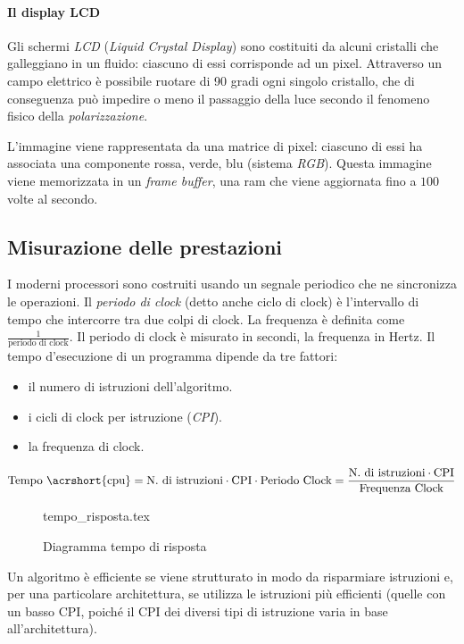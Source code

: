 \documentclass[class=book, crop=false, oneside]{standalone}
\begin{document}
\paragraph{Il display LCD}
Gli schermi \emph{LCD} (\emph{Liquid Crystal Display}) sono costituiti da alcuni cristalli che galleggiano in un fluido: ciascuno di essi corrisponde ad un pixel.
Attraverso un campo elettrico è possibile ruotare di 90 gradi ogni singolo cristallo, che di conseguenza può impedire o meno il passaggio della luce secondo il fenomeno fisico della \emph{polarizzazione}.

L'immagine viene rappresentata da una matrice di pixel: ciascuno di essi ha associata una componente rossa, verde, blu (sistema \emph{RGB}).
Questa immagine viene memorizzata in un \emph{frame buffer}, una \acrshort{ram} che viene aggiornata fino a \(100\) volte al secondo.

\subsection{Misurazione delle prestazioni}
I moderni processori sono costruiti usando un segnale periodico che ne sincronizza le operazioni. Il \emph{periodo di clock} (detto anche ciclo di clock) è l'intervallo di tempo che intercorre tra due colpi di clock. La frequenza è definita come \(\frac{1}{\text{periodo di clock}}\). Il periodo di clock è misurato in secondi, la frequenza in Hertz. Il tempo d'esecuzione di un programma dipende da tre fattori:
\begin{itemize}[nolistsep]
	\item il numero di istruzioni dell'algoritmo.
	\item i cicli di clock per istruzione (\emph{CPI}).
	\item la frequenza di clock.
\end{itemize}

\begin{equation*}
\text{Tempo \acrshort{cpu}} = \text{N. di istruzioni} \cdot \text{CPI} \cdot \text{Periodo Clock} = \frac{\text{N. di istruzioni} \cdot \text{CPI}}{\text{Frequenza Clock}}
\end{equation*}

\begin{figure}[H]
	\centering
	{tempo_risposta.tex}
	\caption{Diagramma tempo di risposta}
\end{figure}

Un algoritmo è efficiente se viene strutturato in modo da risparmiare istruzioni e, per una particolare architettura, se utilizza le istruzioni più efficienti (quelle con un basso CPI, poiché il CPI dei diversi tipi di istruzione varia in base all'architettura).
\end{document}
